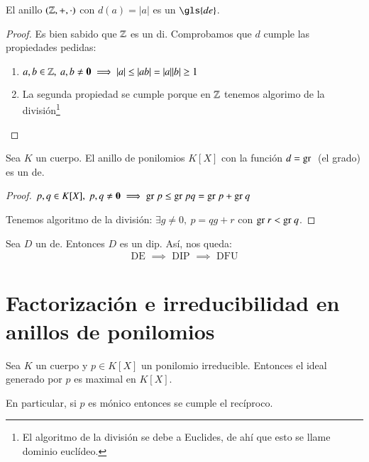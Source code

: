 \begin{ej}
	El anillo $(\mathbb{Z}, +, \cdot)$ con $d(a) = |a|$ es un $\gls{de}$.
\end{ej}

\begin{proof}
	Es bien sabido que $\mathbb{Z}$ es un \gls{di}. Comprobamos que $d$ cumple las propiedades pedidas:
	\begin{enumerate}
		\item $a,b \in \mathbb{Z},\ a,b \neq \mathbf{0} \implies |a| \leq |ab| = |a||b| \geq 1$
		\item La segunda propiedad se cumple porque en $\mathbb{Z}$ tenemos algorimo de la división\footnote{El algoritmo de la división se debe a Euclides, de ahí que esto se llame dominio euclídeo.}
	\end{enumerate}
\end{proof}

\begin{ej}
	Sea $K$ un cuerpo. El anillo de ponilomios $K[X]$ con la función $d = \text{gr }$ (el grado) es un \gls{de}.
\end{ej}

\begin{proof}
	\item $p,q \in K[X],\ p,q \neq \mathbf{0} \implies \text{gr } p \leq \text{gr } pq = \text{gr } p + \text{gr } q$
	\item Tenemos algoritmo de la división: $\exists g \neq 0,\ p = qg + r$ con $\text{gr } r < \text{gr } q$.
\end{proof}

\begin{thm}Sea $D$ un \gls{de}. Entonces $D$ es un \gls{dip}. Así, nos queda:
	\begin{align*}
		\text{ DE } \implies \text{ DIP } \implies \text{ DFU }
	\end{align*}
\end{thm}


\section{Factorización e irreducibilidad en anillos de ponilomios}



\begin{thm}\cite[p.~232]{dor96}
	\label{pro:irreducibleimpliesmaximal}
	Sea $K$ un cuerpo y $p \in K[X]$ un ponilomio irreducible. Entonces el ideal generado por $p$ es maximal en $K[X]$.
\end{thm}

En particular, si $p$ es mónico entonces se cumple el recíproco.

